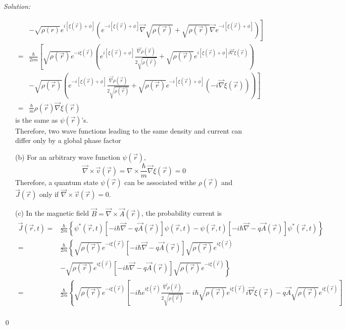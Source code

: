\documentclass[12pt,a4paper]{article}
\newenvironment{sol}
    {\emph{Solution:}
    }
    {
    \qed
    }
\begin{document}
\begin{sol}
\begin{itemize}
\begin{align}
\nonumber&\left.-\sqrt{\rho(r)}e^{i[\xi(\vec{r})+\phi]}\left(e^{-i[\xi(\vec{r})+\phi]}\vec{\nabla}\sqrt{\rho(\vec{r})}+\sqrt{\rho(\vec{r})}\vec{\nabla}e^{-i[\xi(\vec{r})+\phi]}\right)\right]\\
\nonumber=&\frac{\hbar}{2im}\left[\sqrt{\rho(\vec{r})}e^{-i\xi(\vec{r})}\left(e^{i[\xi(\vec{r})+\phi]}\frac{\vec{\nabla}\rho(\vec{r})}{2\sqrt{\rho(\vec{r})}}+\sqrt{\rho(\vec{r})}e^{i[\xi(\vec{r})+\phi]i\vec{\nabla}\xi(\vec{r})}\right)\right.\\
\nonumber&\left.-\sqrt{\rho(\vec{r})}\left(e^{-i[\xi(\vec{r})+\phi]}\frac{\vec{\nabla}\rho(\vec{r})}{2\sqrt{\rho(\vec{r})}}+\sqrt{\rho(\vec{r})}e^{-i[\xi(\vec{r})+\phi]}(-i\vec{\nabla}\xi(\vec{r}))\right)\right]\\
=&\frac{\hbar}{m}\rho(\vec{r})\vec{\nabla}\xi(\vec{r})
\end{align}
is the same as $\psi(\vec{r})$'s.\\
Therefore, two wave functions leading to the same density and current can differ only by a global phase factor
\item[(b)] For an arbitrary wave function $\psi(\vec{r})$,
\begin{equation}
\nonumber\vec{\nabla}\times\vec{v}(\vec{r})=\nabla\times\frac{\hbar}{m}\vec{\nabla}\xi(\vec{r})=0
\end{equation}
Therefore, a quantum state $\psi(\vec{r})$ can be associated withe $\rho(\vec{r})$ and $\vec{J}(\vec{r})$ only if $\vec{\nabla}\times\vec{v}(\vec{r})=0$.
\item[(c)] In the magnetic field $\vec{B}=\vec{\nabla}\times\vec{A}(\vec{r})$, the probability current is
\begin{align}
\nonumber\vec{J}(\vec{r},t)=&\frac{\hbar}{2m}\left\{\psi^*(\vec{r},t)[-i\hbar\vec{\nabla}-q\vec{A}(\vec{r})]\psi(\vec{r},t)-\psi(\vec{r},t)[-i\hbar\vec{\nabla}-q\vec{A}(\vec{r})]\psi^*(\vec{r},t)\right\}\\
\nonumber=&\frac{\hbar}{2m}\left\{\sqrt{\rho(\vec{r})}e^{-i\xi(\vec{r})}[-i\hbar\vec{\nabla}-q\vec{A}(\vec{r})]\sqrt{\rho(\vec{r})}e^{i\xi(\vec{r})}\right.\\
\nonumber&\left.-\sqrt{\rho(\vec{r})}e^{i\xi(\vec{r})}[-i\hbar\vec{\nabla}-q\vec{A}(\vec{r})]\sqrt{\rho(\vec{r})}e^{-i\xi(\vec{r})}\right\}\\
\nonumber=&\frac{\hbar}{2m}\left\{\sqrt{\rho(\vec{r})}e^{-i\xi(\vec{r})}\left[-i\hbar e^{i\xi(\vec{r})}\frac{\vec{\nabla}\rho(\vec{r})}{2\sqrt{\rho(\vec{r})}}-i\hbar\sqrt{\rho(\vec{r})}e^{i\xi(\vec{r})}i\vec{\nabla}\xi(\vec{r})-q\vec{A}\sqrt{\rho(\vec{r})}e^{i\xi(\vec{r})}\right]\right.\\

\end{align}
\end{itemize}
\end{sol}
\end{document}
